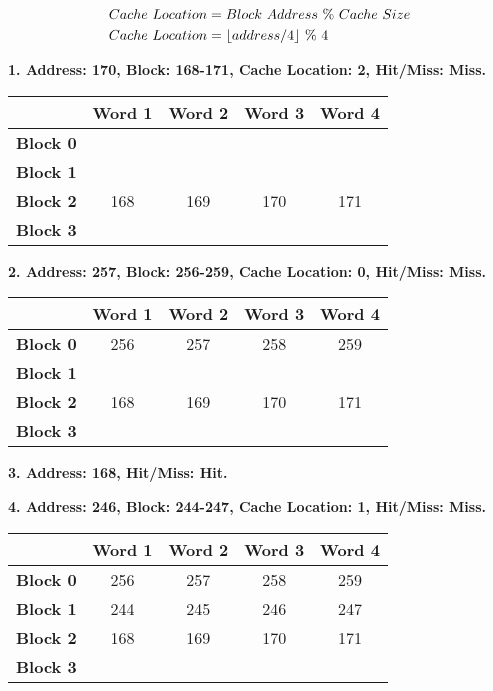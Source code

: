 \documentclass[a4paper, 11pt]{exam}
\DeclarePairedDelimiter\floor{\lfloor}{\rfloor}
\begin{document}
\begin{enumerate}
\begin{align*}
Cache \ Location &= Block \ Address \ \% \ Cache \ Size \\
Cache \ Location &= \floor*{address / 4} \ \% \ 4
\end{align*}

\textbf{1. Address: 170, Block: 168-171, Cache Location: 2, Hit/Miss: Miss.}

\begin{center}
	\begin{tabular}{ |c|c|c|c|c| } 
		\hline
		&\textbf{Word 1}& \textbf{Word 2}& \textbf{Word 3} & \textbf{Word 4}\\ 
		\hline
		\textbf{Block 0} &  &  & & \\ 
		\hline
		\textbf{Block 1} &  &   &  &\\ 
		\hline
		\textbf{Block 2} & 168 & 169  & 170 & 171\\ 
		\hline
		\textbf{Block 3} &  &   &  &\\ 
		\hline
	\end{tabular}
\end{center}

\textbf{2. Address: 257, Block: 256-259, Cache Location: 0, Hit/Miss: Miss.}

\begin{center}
	\begin{tabular}{ |c|c|c|c|c| } 
		\hline
		&\textbf{Word 1}& \textbf{Word 2}& \textbf{Word 3} & \textbf{Word 4}\\ 
		\hline
		\textbf{Block 0} &  256 &  257 & 258 & 259\\ 
		\hline
		\textbf{Block 1} &  &   &  &\\ 
		\hline
		\textbf{Block 2} & 168 & 169  & 170 & 171\\ 
		\hline
		\textbf{Block 3} &  &   &  &\\ 
		\hline
	\end{tabular}
\end{center}

\textbf{3. Address: 168, Hit/Miss: Hit.}

\textbf{4. Address: 246, Block: 244-247, Cache Location: 1, Hit/Miss: Miss.}

\begin{center}
	\begin{tabular}{ |c|c|c|c|c| } 
		\hline
		&\textbf{Word 1}& \textbf{Word 2}& \textbf{Word 3} & \textbf{Word 4}\\ 
		\hline
		\textbf{Block 0} &  256 &  257 & 258 & 259\\ 
		\hline
		\textbf{Block 1} &  244 & 245 & 246 & 247\\ 
		\hline
		\textbf{Block 2} & 168 & 169  & 170 & 171\\ 
		\hline
		\textbf{Block 3} &  &   &  &\\ 
		\hline
	\end{tabular}
\end{center}


\end{enumerate}
\end{document}
